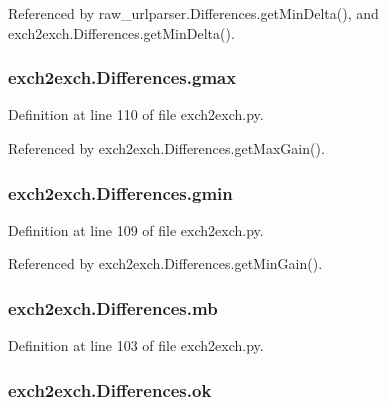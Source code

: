 Referenced by raw\-\_\-urlparser.\-Differences.\-get\-Min\-Delta(), and exch2exch.\-Differences.\-get\-Min\-Delta().

\hypertarget{classexch2exch_1_1_differences_a569f2a6fa0e33ad725c3c3ada259ddcc}{
\subsubsection[{gmax}]{\setlength{\rightskip}{0pt plus 5cm}exch2exch.\-Differences.\-gmax}}\label{classexch2exch_1_1_differences_a569f2a6fa0e33ad725c3c3ada259ddcc}


Definition at line 110 of file exch2exch.\-py.



Referenced by exch2exch.\-Differences.\-get\-Max\-Gain().

\hypertarget{classexch2exch_1_1_differences_a33c9add531b5b46c49ae322657343382}{
\subsubsection[{gmin}]{\setlength{\rightskip}{0pt plus 5cm}exch2exch.\-Differences.\-gmin}}\label{classexch2exch_1_1_differences_a33c9add531b5b46c49ae322657343382}


Definition at line 109 of file exch2exch.\-py.



Referenced by exch2exch.\-Differences.\-get\-Min\-Gain().

\hypertarget{classexch2exch_1_1_differences_a81c81e9c15b5ea8a5d39bb99d85250e1}{
\subsubsection[{mb}]{\setlength{\rightskip}{0pt plus 5cm}exch2exch.\-Differences.\-mb}}\label{classexch2exch_1_1_differences_a81c81e9c15b5ea8a5d39bb99d85250e1}


Definition at line 103 of file exch2exch.\-py.

\hypertarget{classexch2exch_1_1_differences_a6de3ee563584c83a97ba815db8ec7831}{
\subsubsection[{ok}]{\setlength{\rightskip}{0pt plus 5cm}exch2exch.\-Differences.\-ok}}\label{classexch2exch_1_1_differences_a6de3ee563584c83a97ba815db8ec7831}


